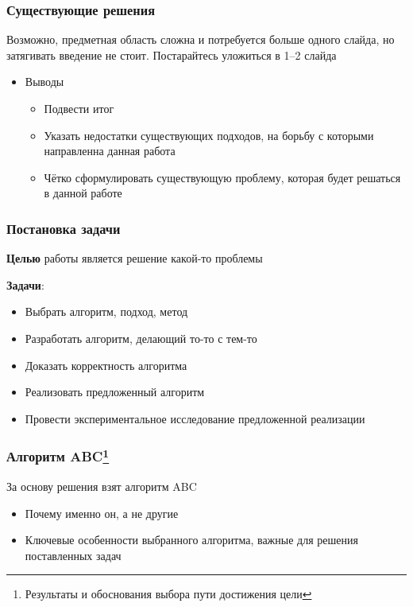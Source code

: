 \documentclass
  [ russian
  , aspectratio=1610 %
  ] {beamer}
\begin{document}
\begin{frame}
    \frametitle{Существующие решения}
    Возможно, предметная область сложна и потребуется больше одного слайда, но затягивать введение не стоит. Постарайтесь уложиться в 1--2 слайда
    \begin{itemize}
        \item Выводы
              \begin{itemize}
                  \item Подвести итог
                  \item Указать недостатки существующих подходов, на борьбу с которыми
                        направленна данная работа
                  \item Чётко сформулировать существующую проблему, которая будет решаться в данной работе
              \end{itemize}
    \end{itemize}
\end{frame}

\begin{frame}
    \frametitle{Постановка задачи}
    \textbf{Целью} работы является решение какой-то проблемы %
    \vspace{1em}

    \textbf{Задачи}:
    \begin{itemize}
        \item Выбрать алгоритм, подход, метод %
        \item Разработать алгоритм, делающий то-то с тем-то
        \item Доказать корректность алгоритма
        \item Реализовать предложенный алгоритм
        \item Провести экспериментальное исследование предложенной реализации
    \end{itemize}
\end{frame}


\begin{frame}
    \frametitle{Алгоритм ABC\footnote{Результаты и обоснования выбора пути достижения цели}}
    За основу решения взят алгоритм ABC
    \begin{itemize}
        \item Почему именно он, а не другие
        \item Ключевые особенности выбранного алгоритма, важные для решения поставленных задач
    \end{itemize}
\end{frame}
\end{document}

